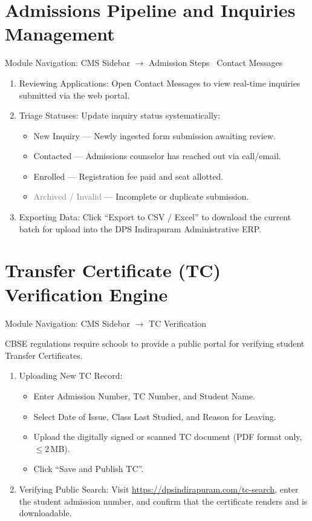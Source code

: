\documentclass[11pt,a4paper,oneside]{report}
\def\textbf#1{#1}
\def\texttt#1{#1}
\def\&{and}
\newcommand{\rolebadge}[2]{\colorbox{#1!15}{\textcolor{#1}{\textbf{\scriptsize #2}}}}
\begin{document}
\section{Admissions Pipeline \& Inquiries Management}

\textbf{Module Navigation:} CMS Sidebar $\rightarrow$ \texttt{Admission Steps} \textbar\ \texttt{Contact Messages}

\begin{enumerate}
  \item \textbf{Reviewing Applications:} Open \texttt{Contact Messages} to view real-time inquiries submitted via the web portal.
  \item \textbf{Triage Statuses:} Update inquiry status systematically:
        \begin{itemize}
          \item \rolebadge{linkblue}{New Inquiry} --- Newly ingested form submission awaiting review.
          \item \rolebadge{dpsgold}{Contacted} --- Admissions counselor has reached out via call/email.
          \item \rolebadge{successgrn}{Enrolled} --- Registration fee paid and seat allotted.
          \item \rolebadge{gray}{Archived / Invalid} --- Incomplete or duplicate submission.
        \end{itemize}
  \item \textbf{Exporting Data:} Click \textbf{``Export to CSV / Excel''} to download the current batch for upload into the DPS Indirapuram Administrative ERP.
\end{enumerate}

\section{Transfer Certificate (TC) Verification Engine}

\textbf{Module Navigation:} CMS Sidebar $\rightarrow$ \texttt{TC Verification}

CBSE regulations require schools to provide a public portal for verifying student Transfer Certificates.

\begin{enumerate}
  \item \textbf{Uploading New TC Record:}
        \begin{itemize}
          \item Enter \textbf{Admission Number}, \textbf{TC Number}, and \textbf{Student Name}.
          \item Select \textbf{Date of Issue}, \textbf{Class Last Studied}, and \textbf{Reason for Leaving}.
          \item Upload the digitally signed or scanned TC document (PDF format only, $\leq$2\,MB).
          \item Click \textbf{``Save \& Publish TC''}.
        \end{itemize}
  \item \textbf{Verifying Public Search:} Visit \url{https://dpsindirapuram.com/tc-search}, enter the student admission number, and confirm that the certificate renders and is downloadable.
\end{enumerate}
\end{document}
